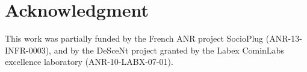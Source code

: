 
\section*{Acknowledgment}

This work was partially funded by the French ANR project SocioPlug
(ANR-13-INFR-0003), and by the DeSceNt project granted by the Labex CominLabs
excellence laboratory (ANR-10-LABX-07-01).

